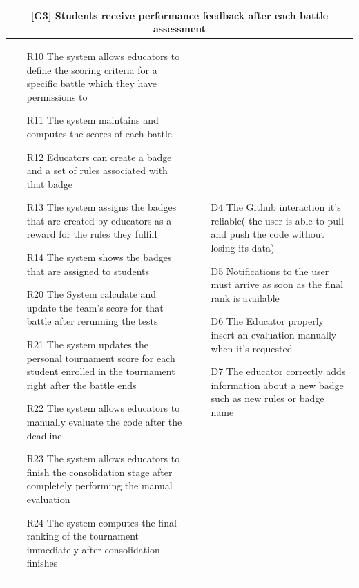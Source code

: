 \begin{tabular}{|p{7cm}|p{7cm}|}
\hline
\multicolumn{2}{|c|}{
\textbf{[G3] Students receive performance feedback after each battle assessment}}
\\
\hline
\begin{itemize}
    \item [R10] The system allows educators to define the scoring criteria for a specific battle which they have permissions to
    \item [R11] The system maintains and computes the scores of each battle
    \item [R12] Educators can create a badge and a set of rules associated with that badge
    \item[R13] The system assigns the badges that are created by educators as a reward for the rules they fulfill
    \item [R14] The system shows the badges that are assigned to students 
    \item [R20] The System calculate and update the team's score for that battle after rerunning the tests
    \item [R21] The system updates the personal tournament score for each student enrolled in the tournament right after the battle ends
    \item [R22] The system allows educators to manually evaluate the code after the deadline
    \item [R23] The system  allows educators to finish the consolidation stage after completely performing the manual evaluation
    \item [R24] The system computes the final ranking of the tournament immediately after consolidation finishes
\end{itemize}
&
\begin{itemize}
    \item [D4] The Github interaction it's reliable( the user is able to pull and push the code without losing its data)
    \item [D5] Notifications to the user must arrive as soon as the final rank is available
    \item [D6] The Educator properly insert an evaluation manually when it’s requested
    \item [D7] The educator correctly adds information about a new badge such as new rules or badge name
\end{itemize}
\\
\hline
\end{tabular}



